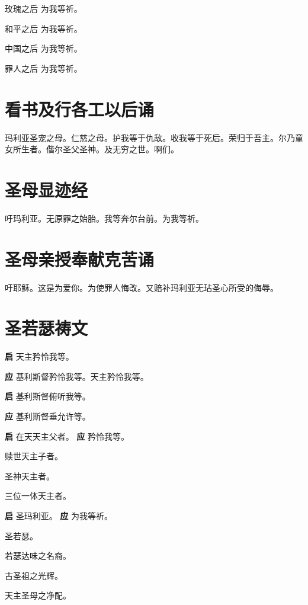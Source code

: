\documentclass[UTF8,17pt]{ctexart}
\begin{document}
玫瑰之后 \quad 为我等祈。

和平之后 \quad 为我等祈。

中国之后 \quad 为我等祈。

罪⼈之后 \quad 为我等祈。

\section{看书及⾏各⼯以后诵}

玛利亚圣宠之母。仁慈之母。护我等于仇敌。收我等于死后。荣归于吾主。尔乃童⼥所⽣者。偕尔圣⽗圣神。及⽆穷之世。啊们。

\section{圣母显迹经}

吁玛利亚。⽆原罪之始胎。我等奔尔台前。为我等祈。

\section{圣母亲授奉献克苦诵}

吁耶稣。这是为爱你。为使罪⼈悔改。又赔补玛利亚⽆玷圣⼼所受的侮辱。

\section{圣若瑟祷⽂}

\textbf{启} \quad 天主矜怜我等。

\textbf{应} \quad 基利斯督矜怜我等。天主矜怜我等。

\textbf{启} \quad 基利斯督俯听我等。

\textbf{应} \quad 基利斯督垂允许等。

\textbf{启} \quad 在天天主⽗者。 \hfill \textbf{应} \quad 矜怜我等。

 赎世天主⼦者。

 圣神天主者。

 三位⼀体天主者。

\textbf{启} \quad 圣玛利亚。 \hfill \textbf{应} \quad 为我等祈。

 圣若瑟。

 若瑟达味之名裔。

 古圣祖之光辉。

 天主圣母之净配。
\end{document}

